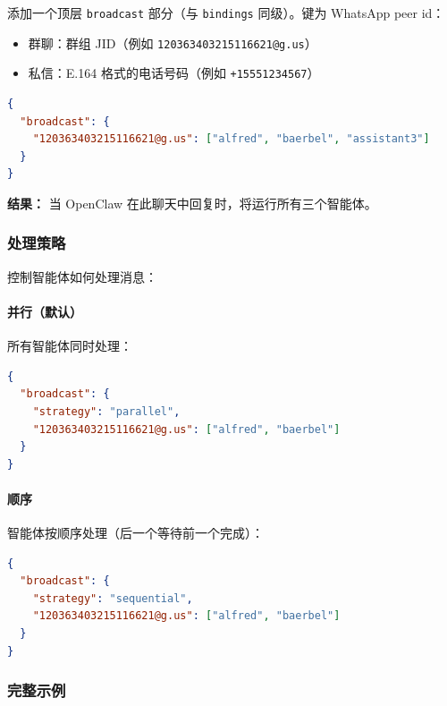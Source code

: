 添加一个顶层 \texttt{broadcast} 部分（与 \texttt{bindings} 同级）。键为 WhatsApp peer id：

\begin{itemize}
  \item 群聊：群组 JID（例如 \texttt{120363403215116621@g.us}）
  \item 私信：E.164 格式的电话号码（例如 \texttt{+15551234567}）
\end{itemize}


\begin{lstlisting}[language=json]
{
  "broadcast": {
    "120363403215116621@g.us": ["alfred", "baerbel", "assistant3"]
  }
}
\end{lstlisting}


\textbf{结果：} 当 OpenClaw 在此聊天中回复时，将运行所有三个智能体。

\subsubsection{处理策略}


控制智能体如何处理消息：

\paragraph{并行（默认）}


所有智能体同时处理：

\begin{lstlisting}[language=json]
{
  "broadcast": {
    "strategy": "parallel",
    "120363403215116621@g.us": ["alfred", "baerbel"]
  }
}
\end{lstlisting}


\paragraph{顺序}


智能体按顺序处理（后一个等待前一个完成）：

\begin{lstlisting}[language=json]
{
  "broadcast": {
    "strategy": "sequential",
    "120363403215116621@g.us": ["alfred", "baerbel"]
  }
}
\end{lstlisting}


\subsubsection{完整示例}



